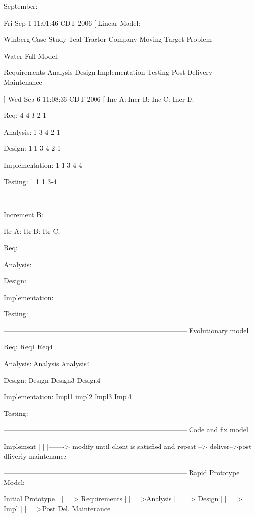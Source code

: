 \documentclass[a4paper]{article}
\begin{document}
September:
{
Fri Sep  1 11:01:46 CDT 2006
[
 Linear Model:\newline
  
Winberg Case Study\newline
Teal Tractor Company\newline
	Moving Target Problem\newline

Water Fall Model:

Requirements
  Analysis
  	Design
		Implementation
			Testing
				Post Delivery Maintenance

]
Wed Sep  6 11:08:36 CDT 2006
[
				Inc A:			Incr B:				Inc C:		Incr D:

Req:			4				4-3					2			1

Analysis:		1				3-4					2			1

Design:			1				1					3-4			2-1

Implementation:	1				1					3-4			4

Testing:		1				1					1			3-4


--------------------------------------------------------------------------------

Increment B:

				Itr A:			Itr B:				Itr C:

Req:				

Analysis:				

Design:						

Implementation:					

Testing:														

--------------------------------------------------------------------------------
Evolutionary  model

Req:				Req1									Req4

Analysis:			Analysis								Analysis4

Design:				Design					Design3			Design4

Implementation:		Impl1		impl2		Impl3			Impl4

Testing:														

--------------------------------------------------------------------------------
Code and fix model

Implement
    |
	|
	|------->  modify until client is satisfied and repeat --> deliver-->post dliveriy maintenance


--------------------------------------------------------------------------------
Rapid Prototype Model:

Initial Prototype
  |
  |__> Requirements
  			|
			|__>Analysis
					|
					|__> Design
							|
							|__> Impl
								   |
								   |__>Post Del. Maintenance 

}
\end{document}
